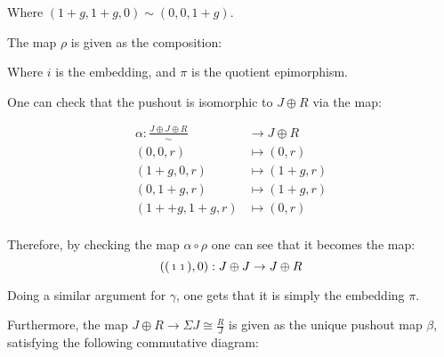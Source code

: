 Where \( (1 + g, 1 + g, 0) \sim (0, 0, 1 + g) \).

The map \( \rho \) is given as the composition:
\begin{center}
\end{center}

Where \( i \) is the embedding, and \( \pi \) is the quotient epimorphism.

One can check that the pushout is isomorphic to \( J \oplus R \) via the map:

\begin{align*}
	\alpha: \frac{J \oplus J \oplus R}{\sim} &\to J \oplus R \\
	(0, 0, r) &\mapsto (0, r) \\
	(1 + g, 0, r) &\mapsto (1 + g, r) \\
	(0, 1 + g, r) &\mapsto (1 + g, r) \\
	(1+ + g, 1 + g, r) &\mapsto (0, r) \\
\end{align*}

Therefore, by checking the map \( \alpha \circ \rho \) one can see that it becomes the map:
\[ 
	(\begin{psmallmatrix}
		1 & 1 \\
	\end{psmallmatrix}, 0):  J \oplus J \to J \oplus R
\]

Doing a similar argument for \( \gamma \), one gets that it is simply the embedding \( \pi \).

Furthermore, the map \( J \oplus R \to \Sigma J \cong \frac{R}{J} \) is given as the unique pushout map \( \beta \), satisfying the following commutative diagram:

\begin{center}
\end{center}


